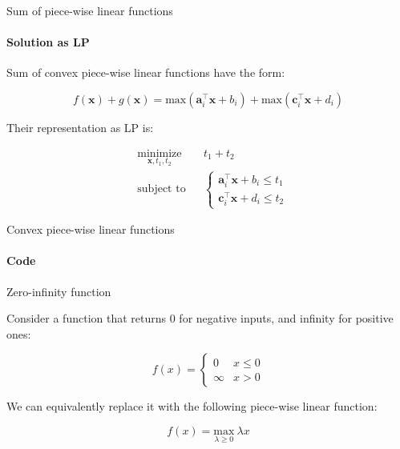 \documentclass{beamer}
\begin{document}
\begin{frame}{Sum of piece-wise linear functions}
\framesubtitle{Solution as LP}
\begin{flushleft}


Sum of convex piece-wise linear functions have the form:

\begin{equation}
    f(\mathbf{x}) + g(\mathbf{x}) = \text{max}(\mathbf{a}_i^\top \mathbf{x} + b_i) +  \text{max}(\mathbf{c}_i^\top \mathbf{x} + d_i)
\end{equation}

\bigskip

Their representation as LP is:

\begin{equation}
\begin{aligned}
& \underset{\mathbf{x}, t_1, t_2}{\text{minimize}}
& & t_1 + t_2 \\
& \text{subject to}
& & \begin{cases}
\mathbf{a}_i^\top \mathbf{x} + b_i \leq t_1 \\
\mathbf{c}_i^\top \mathbf{x} + d_i \leq t_2
\end{cases}
%
\end{aligned}
\end{equation}


 
\end{flushleft}
\end{frame}




\begin{frame}{Convex piece-wise linear functions}
\framesubtitle{Code}
\begin{flushleft}


 
\end{flushleft}
\end{frame}



\begin{frame}{Zero-infinity function}
	\begin{flushleft}
		
		Consider a function that returns 0 for negative inputs, and infinity for positive ones:
		
		\begin{equation}
			f(x) = 
			\begin{cases}
				0 &x \leq 0 \\
				\infty &x > 0
			\end{cases}
		\end{equation}
	
		We can equivalently replace it with the following piece-wise linear function:
		
		\begin{equation}
			f(x) = 
			\underset{\lambda \geq 0}{\text{max}}  \  \lambda x
		\end{equation}		
		
	\end{flushleft}
\end{frame}
\end{document}
